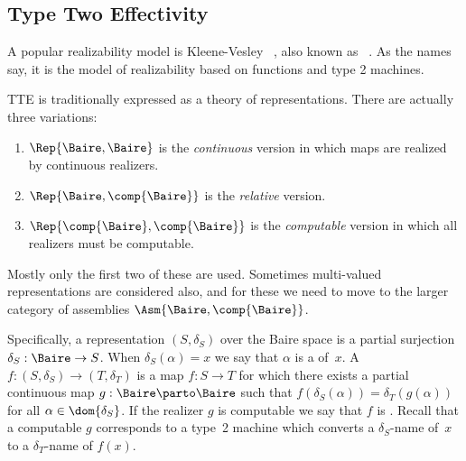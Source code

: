 \subsection{Type Two Effectivity}
\label{sec:tte}

A popular realizability model is Kleene-Vesley ~, also known as ~. As the names say, it is the
model of realizability based on functions and type 2 machines.

TTE is traditionally expressed as a theory of representations. There
are actually three variations:
%
\begin{enumerate}
\item $\Rep{\Baire, \Baire}$ is the \emph{continuous} version in which
  maps are realized by continuous realizers.
\item $\Rep{\Baire, \comp{\Baire}}$ is the \emph{relative} version.
\item $\Rep{\comp{\Baire}, \comp{\Baire}}$ is the \emph{computable}
  version in which all realizers must be computable.
\end{enumerate}
%
Mostly only the first two of these are used. Sometimes multi-valued
representations are considered also, and for these we need to move to
the larger category of assemblies $\Asm{\Baire, \comp{\Baire}}$.

Specifically, a representation $(S, \delta_S)$ over the Baire space is
a partial surjection $\delta_S : \Baire \to S$. When $\delta_S(\alpha)
= x$ we say that $\alpha$ is a  of~$x$. A
 $f :(S, \delta_S) \to (T,
\delta_T)$ is a map $f : S \to T$ for which there exists a partial
continuous map $g : \Baire \parto \Baire$ such that
$f(\delta_S(\alpha)) = \delta_T(g(\alpha))$ for all $\alpha \in
\dom{\delta_S}$. If the realizer $g$ is computable we say that $f$ is
. Recall that a computable $g$ corresponds
to a type~2 machine which converts a $\delta_S$-name of~$x$ to a
$\delta_T$-name of $f(x)$.

